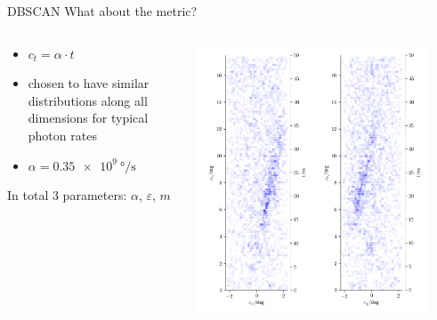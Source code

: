 \begin{frame}{DBSCAN}
  What about the metric?
  \begin{columns}[onlytextwidth]
    \begin{column}{0.475\textwidth}
      \begin{itemize}
        \item $c_t = \alpha\cdot t$
        \item chosen to have similar distributions along all dimensions for typical photon rates
        \item $\alpha = \SI{0,35e9}{\degree\per\second}$
      \end{itemize}
      \vspace{1cm}
      In total 3 parameters: $\alpha$, $\varepsilon$, $m$
    \end{column}
    \begin{column}{0.475\textwidth}
      \includegraphics[width=0.9\textwidth]{fig/metric.png}
    \end{column}
  \end{columns}
\end{frame}

